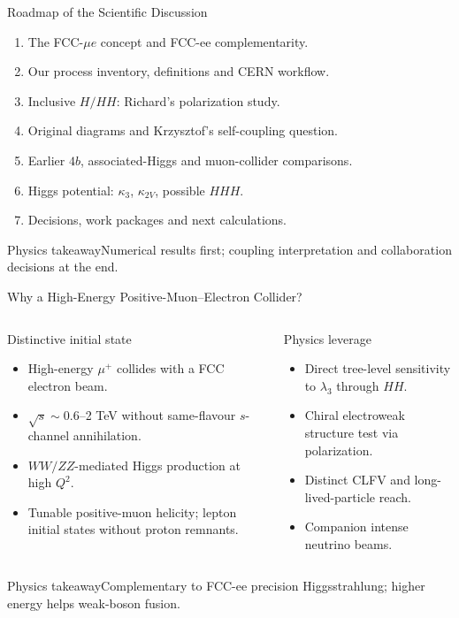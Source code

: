 \documentclass[aspectratio=1610,english]{beamer}
\newcommand{\src}[1]{\vfill{\par\color{black!65}\fontsize{6.4}{7.4}\selectfont\emph{Source:} #1\par}}
\newcommand{\key}[1]{\begin{alertblock}{Physics takeaway}\scriptsize #1\end{alertblock}}
\begin{document}
\begin{frame}[t]{Roadmap of the Scientific Discussion}
\normalsize

\begin{enumerate}
\item The FCC-$\mu e$ concept and FCC-ee complementarity.
\item Our process inventory, definitions and CERN workflow.
\item Inclusive $H/HH$: Richard's polarization study.
\item Original diagrams and Krzysztof's self-coupling question.
\item Earlier $4b$, associated-Higgs and muon-collider comparisons.
\item Higgs potential: $\kappa_3$, $\kappa_{2V}$, possible $HHH$.
\item Decisions, work packages and next calculations.
\end{enumerate}
\key{Numerical results first; coupling interpretation and collaboration decisions at the end.}

\end{frame}

\begin{frame}[t]{Why a High-Energy Positive-Muon--Electron Collider?}
\small

\begin{columns}%
\begin{block}{Distinctive initial state}
\begin{itemize}\item High-energy $\mu^+$ collides with a FCC electron beam.
\item $\sqrt{s}\sim0.6$--2 TeV without same-flavour $s$-channel annihilation.
\item $WW/ZZ$-mediated Higgs production at high $Q^2$.
\item Tunable positive-muon helicity; lepton initial states without proton remnants.
\end{itemize}\end{block}
\begin{alertblock}{Physics leverage}
\begin{itemize}\item Direct tree-level sensitivity to $\lambda_3$ through $HH$.
\item Chiral electroweak structure test via polarization.
\item Distinct CLFV and long-lived-particle reach.
\item Companion intense neutrino beams.
\end{itemize}\end{alertblock}
\end{columns}
\key{Complementary to FCC-ee precision Higgsstrahlung; higher energy helps weak-boson fusion.}

\end{frame}
\end{document}
